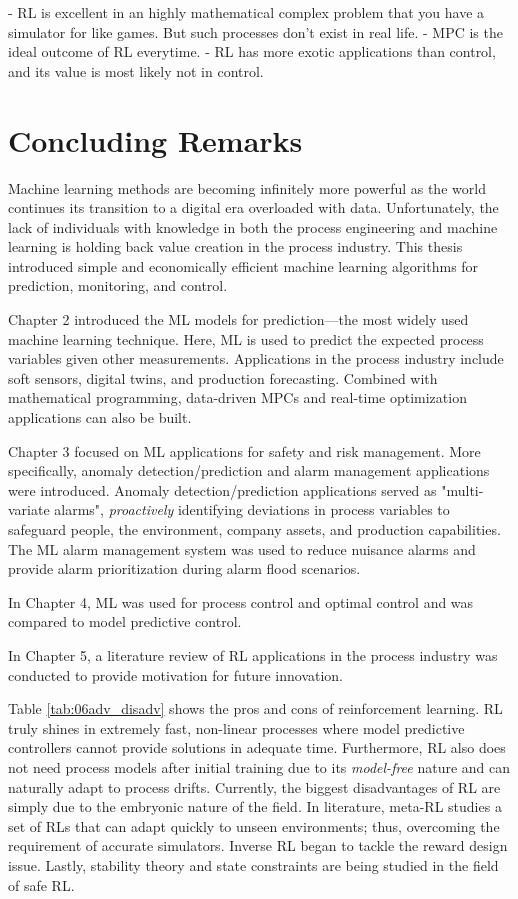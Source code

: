 - RL is excellent in an highly mathematical complex problem that you have a simulator for like games.  But such processes don't exist in real life.
- MPC is the ideal outcome of RL everytime.
- RL has more exotic applications than control, and its value is most likely not in control.

\section{Concluding Remarks}
Machine learning methods are becoming infinitely more powerful as the world continues its transition to a digital era overloaded with data.  Unfortunately, the lack of individuals with knowledge in both the process engineering and machine learning is holding back value creation in the process industry.  This thesis introduced simple and economically efficient machine learning algorithms for prediction, monitoring, and control.

Chapter 2 introduced the ML models for prediction---the most widely used machine learning technique.  Here, ML is used to predict the expected process variables given other measurements.  Applications in the process industry include soft sensors, digital twins, and production forecasting.  Combined with mathematical programming, data-driven MPCs and real-time optimization applications can also be built.

Chapter 3 focused on ML applications for safety and risk management.  More specifically, anomaly detection/prediction and alarm management applications were introduced.  Anomaly detection/prediction applications served as "multi-variate alarms", \textit{proactively} identifying deviations in process variables to safeguard people, the environment, company assets, and production capabilities.  The ML alarm management system was used to reduce nuisance alarms and provide alarm prioritization during alarm flood scenarios.

In Chapter 4, ML was used for process control and optimal control and was compared to model predictive control.  



In Chapter 5, a literature review of RL applications in the process industry was conducted to provide motivation for future innovation.


Table \ref{tab:06adv_disadv} shows the pros and cons of reinforcement learning. RL truly shines in extremely fast, non-linear processes where model predictive controllers cannot provide solutions in adequate time.  Furthermore, RL also does not need process models after initial training due to its \textit{model-free} nature and can naturally adapt to process drifts. Currently, the biggest disadvantages of RL are simply due to the embryonic nature of the field. In literature, meta-RL studies a set of RLs that can adapt quickly to unseen environments; thus, overcoming the requirement of accurate simulators.  Inverse RL began to tackle the reward design issue. Lastly, stability theory and state constraints are being studied in the field of safe RL. 

